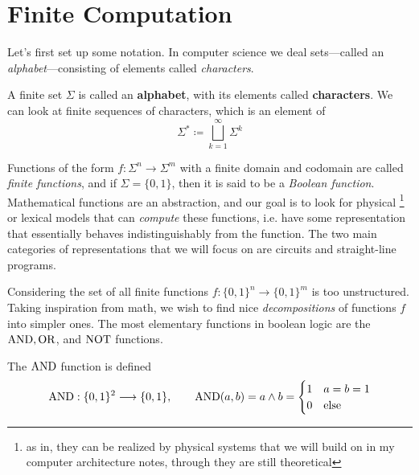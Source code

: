\section{Finite Computation}

  Let's first set up some notation. In computer science we deal sets---called an \textit{alphabet}---consisting of elements called \textit{characters}.  

  \begin{definition}[Alphabet]
    A finite set $\Sigma$ is called an \textbf{alphabet}, with its elements called \textbf{characters}. We can look at finite sequences of characters, which is an element of 
    \begin{equation}
      \Sigma^\ast \coloneqq \bigsqcup_{k=1}^\infty \Sigma^k 
    \end{equation}
  \end{definition}

  Functions of the form $f: \Sigma^n \to \Sigma^m$ with a finite domain and codomain are called \textit{finite functions}, and if $\Sigma = \{0, 1\}$, then it is said to be a \textit{Boolean function}. Mathematical functions are an abstraction, and our goal is to look for physical \footnote{as in, they can be realized by physical systems that we will build on in my computer architecture notes, through they are still theoretical} or lexical models that can \textit{compute} these functions, i.e. have some representation that essentially behaves indistinguishably from the function. The two main categories of representations that we will focus on are circuits and straight-line programs. 

  Considering the set of all finite functions $f: \{0, 1\}^n \to \{0, 1\}^m$ is too unstructured. Taking inspiration from math, we wish to find nice \textit{decompositions} of functions $f$ into simpler ones. The most elementary functions in boolean logic are the $\AND, \OR$, and $\NOT$ functions.  

  \begin{definition}
    The $\AND$ function is defined 
    \begin{equation}
      \AND: \{0,1\}^2 \longrightarrow \{0,1\}, \qquad 
      \AND (a,b) = a \wedge b = \begin{cases}
        1 & a = b = 1 \\
        0 & \text{else}
      \end{cases}
    \end{equation}
  \end{definition}

